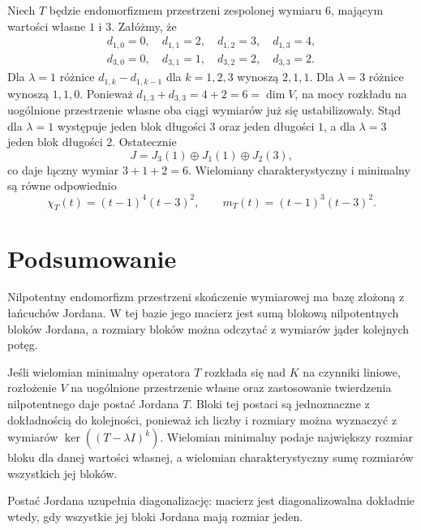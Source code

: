 \begin{przyklad}
\label{prz:lin17-jordan-kernels}
Niech \(T\) będzie endomorfizmem
przestrzeni zespolonej wymiaru \(6\),
mającym wartości własne \(1\) i \(3\).
Załóżmy, że
\[
 \begin{gathered}
 d_{1,0}=0,\quad d_{1,1}=2,\quad
 d_{1,2}=3,\quad d_{1,3}=4,\\
 d_{3,0}=0,\quad d_{3,1}=1,\quad
 d_{3,2}=2,\quad d_{3,3}=2.
 \end{gathered}
\]
Dla \(\lambda=1\) różnice
\(d_{1,k}-d_{1,k-1}\)
dla \(k=1,2,3\) wynoszą \(2,1,1\).
Dla \(\lambda=3\) różnice wynoszą \(1,1,0\).
Ponieważ \(d_{1,3}+d_{3,3}=4+2=6=\dim V\),
na mocy rozkładu na uogólnione przestrzenie własne
oba ciągi wymiarów już się ustabilizowały.
Stąd dla \(\lambda=1\) występuje jeden blok
długości \(3\) oraz jeden długości \(1\),
a dla \(\lambda=3\) jeden blok długości \(2\).
Ostatecznie
\[
 J=J_3(1)\oplus J_1(1)\oplus J_2(3),
\]
co daje łączny wymiar \(3+1+2=6\).
Wielomiany charakterystyczny i minimalny
są równe odpowiednio
\[
 \chi_T(t)=(t-1)^4(t-3)^2,
 \qquad
 m_T(t)=(t-1)^3(t-3)^2.
\]
\end{przyklad}

\section{Podsumowanie}
\label{sec:lin17-summary}

Nilpotentny endomorfizm przestrzeni
skończenie wymiarowej ma bazę
złożoną z łańcuchów Jordana.
W tej bazie jego macierz jest
sumą blokową nilpotentnych bloków Jordana,
a rozmiary bloków można odczytać
z wymiarów jąder kolejnych potęg.

Jeśli wielomian minimalny operatora \(T\)
rozkłada się nad \(K\) na czynniki liniowe,
rozłożenie \(V\) na uogólnione przestrzenie własne
oraz zastosowanie twierdzenia nilpotentnego
daje postać Jordana \(T\).
Bloki tej postaci są jednoznaczne
z dokładnością do kolejności,
ponieważ ich liczby i rozmiary
można wyznaczyć z wymiarów
\(\ker((T-\lambda I)^k)\).
Wielomian minimalny podaje największy
rozmiar bloku dla danej wartości własnej,
a wielomian charakterystyczny sumę
rozmiarów wszystkich jej bloków.

Postać Jordana uzupełnia diagonalizację:
macierz jest diagonalizowalna
dokładnie wtedy, gdy wszystkie jej
bloki Jordana mają rozmiar jeden.
